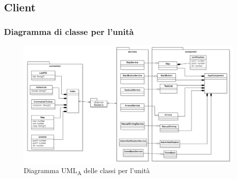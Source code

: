 \subsection{Client}
\subsubsection{Diagramma di classe per l'unità}

\begin{figure}[H]
	\centering
	\includegraphics[scale=0.5]{res/images/UML_operatore.png}
	\caption{Diagramma UML\textsubscript{A} delle classi per l'unità}
\end{figure}

